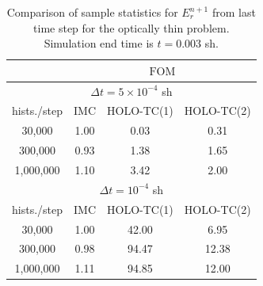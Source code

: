 \documentclass{anstrans}
\newcommand{\FOM}{\ensuremath{\text{FOM}}}
\renewcommand{\ss}{\ensuremath{\|s\|}}
\begin{document}

\begin{table}
\centering
\caption{\label{tab:fom_thin} {Comparison of sample statistics for $E_r^{n+1}$ from last time step for the optically
    thin problem.  Simulation end time is $t=0.003$ sh.}}
\begin{tabular}{|c|ccc|}\cline{2-4}
    \multicolumn{1}{c|}{}       &
    \multicolumn{3}{|c|}{\FOM} \\ \hline
    \multicolumn{4}{|c|}{$\Delta t = 5\times10^{-4}$ sh} \\\hline
hists./step   &   IMC   & HOLO-TC(1) & HOLO-TC(2) \\ \hline
   30,000     &   1.00  & 0.03  &  0.31      \\
  300,000     &   0.93  & 1.38  &  1.65     \\ 
  1,000,000   &   1.10  & 3.42  &  2.00      \\ \hline
    \multicolumn{4}{|c|}{$\Delta t = 10^{-4}$ sh} \\\hline
hists./step   &  IMC   & HOLO-TC(1) & HOLO-TC(2) \\ \hline
   30,000     &  1.00  &  42.00    & 6.95    \\
  300,000     &  0.98  &  94.47    & 12.38    \\ 
  1,000,000   &  1.11  &  94.85    & 12.00   \\ \hline
\end{tabular}
\end{table}
\end{document}
